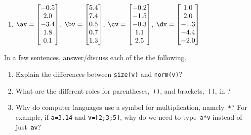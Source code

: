 \begin{exercise}
\begin{enumerate}
\item \(\av=\begin{bmatrix}-0.5\\2.0\\-3.4\\1.8\\0.1\end{bmatrix}\), \(\bv=\begin{bmatrix}5.4\\7.4\\0.5\\0.7\\1.3\end{bmatrix}\), \(\cv=\begin{bmatrix} -0.2\\-1.5\\-0.3\\1.1\\2.5\end{bmatrix}\), \(\dv=\begin{bmatrix}1.0\\2.0\\-1.3\\-4.4\\-2.0\end{bmatrix}\)
\setbox\ajrqrbox\hbox{}%
\marginpar{\usebox{\ajrqrbox\\[2ex]}}%

\end{enumerate}
\end{exercise}





\begin{exercise} \label{ex:} 
In a few sentences, answer\slash discuss each of the the following.
\begin{enumerate}
\item Explain the differences between \verb|size(v)| and \verb|norm(v)|?

\item What are the different roles for parentheses,~\verb|()|, and brackets,~\verb|[]|, in \script?

\item Why do computer languages use a symbol for multiplication, namely~\verb|*|?  For example, if \verb|a=3.14| and \verb|v=[2;3;5]|, why do we need to type~\verb|a*v| instead of just~\verb|av|?

\end{enumerate}
\end{exercise}

\begin{comment}%
why, what caused X?
how did X occur?
what-if? what-if-not?
how does X compare with Y?
what is the evidence for X?
why is X important?
\end{comment}
